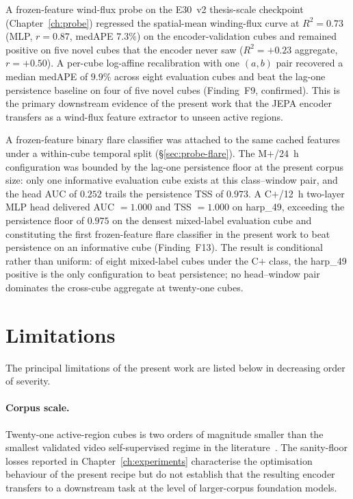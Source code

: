 A frozen-feature wind-flux probe on the E30~v2 thesis-scale
checkpoint (Chapter~\ref{ch:probe}) regressed the spatial-mean
winding-flux curve at $R^{2} = 0.73$ (MLP, $r = 0.87$, medAPE
$7.3\%$) on the encoder-validation cubes and remained positive on
five novel cubes that the encoder never saw ($R^{2} = +0.23$
aggregate, $r = +0.50$). A per-cube log-affine recalibration with
one $(a, b)$ pair recovered a median medAPE of $9.9\%$ across eight
evaluation cubes and beat the lag-one persistence baseline on
four of five novel cubes (Finding~F9, confirmed). This is the
primary downstream evidence of the present work that the JEPA
encoder transfers as a wind-flux feature extractor to unseen
active regions.

A frozen-feature binary flare classifier was attached to the same
cached features under a within-cube temporal split
(\S\ref{sec:probe-flare}). The M$+$/24~h configuration was bounded
by the lag-one persistence floor at the present corpus size: only
one informative evaluation cube exists at this class--window pair,
and the head AUC of $0.252$ trails the persistence TSS of $0.973$.
A C$+$/12~h two-layer MLP head delivered AUC $= 1.000$ and
TSS $= 1.000$ on harp\_49, exceeding the persistence floor of
$0.975$ on the densest mixed-label evaluation cube and constituting
the first frozen-feature flare classifier in the present work to
beat persistence on an informative cube (Finding~F13). The result
is conditional rather than uniform: of eight mixed-label cubes
under the C$+$ class, the harp\_49 positive is the only configuration
to beat persistence; no head--window pair dominates the cross-cube
aggregate at twenty-one cubes.

\section{Limitations}
\label{sec:sum-limits}

The principal limitations of the present work are listed below in
decreasing order of severity.

\paragraph{Corpus scale.} Twenty-one active-region cubes is two
orders of magnitude smaller than the smallest validated video
self-supervised regime in the
literature~\cite{tong2022videomae,wang2023videomaev2}. The
sanity-floor losses reported in Chapter~\ref{ch:experiments}
characterise the optimisation behaviour of the present recipe but
do not establish that the resulting encoder transfers to a
downstream task at the level of larger-corpus foundation models.


